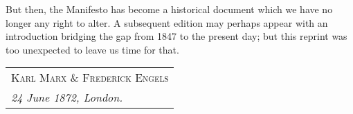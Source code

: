 But then, the Manifesto has become a historical document which we have no longer any right to alter. A subsequent edition may perhaps appear with an introduction bridging the gap from 1847 to the present day; but this reprint was too unexpected to leave us time for that. 

\hfill
\begin{tabular}{@{}l@{}}
\scshape Karl Marx \& Frederick Engels \\
\emph{24 June 1872, London.}
\end{tabular}